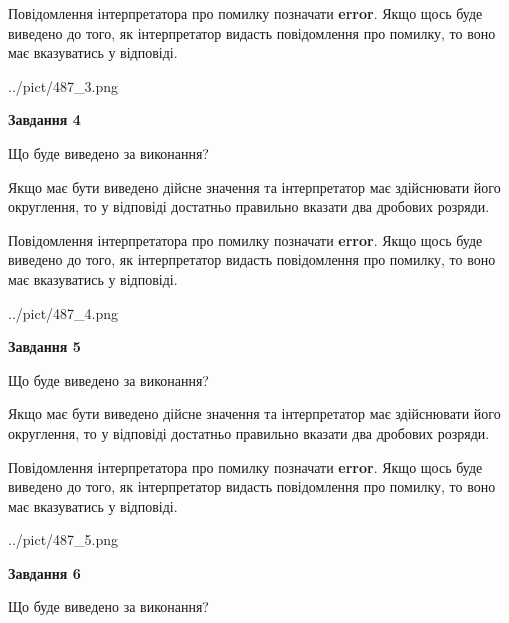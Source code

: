 \documentclass[12pt, ukrainian]{article}
\begin{document}
{\begin {Large}
Повідомлення інтерпретатора про помилку позначати \textbf{error}.
Якщо щось буде виведено до того, як інтерпретатор видасть повідомлення про помилку, 
то воно має вказуватись у відповіді. \par

\begin{center}
	{../pict/487_3.png}
\end{center}
\newpage

{\begin {center}\textbf{Завдання 4}\end {center}}\par
Що буде виведено за виконання? \par

Якщо має бути виведено дійсне значення та інтерпретатор має здійснювати його округлення, 
то у відповіді достатньо правильно вказати два дробових розряди.

Повідомлення інтерпретатора про помилку позначати \textbf{error}.
Якщо щось буде виведено до того, як інтерпретатор видасть повідомлення про помилку, 
то воно має вказуватись у відповіді. \par

\begin{center}
	{../pict/487_4.png}
\end{center}
\newpage

{\begin {center}\textbf{Завдання 5}\end {center}}\par
Що буде виведено за виконання? \par

Якщо має бути виведено дійсне значення та інтерпретатор має здійснювати його округлення, 
то у відповіді достатньо правильно вказати два дробових розряди.

Повідомлення інтерпретатора про помилку позначати \textbf{error}.
Якщо щось буде виведено до того, як інтерпретатор видасть повідомлення про помилку, 
то воно має вказуватись у відповіді. \par

\begin{center}
	{../pict/487_5.png}
\end{center}
\newpage

{\begin {center}\textbf{Завдання 6}\end {center}}\par
Що буде виведено за виконання? \par


\end{Large}}
\end{document}

